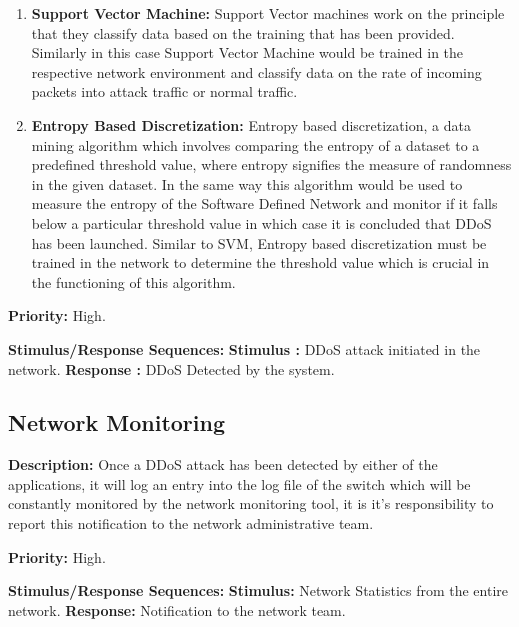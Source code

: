 \documentclass[12pt,a4paper,final]{report}
\begin{document}
\begin{enumerate}
\item 
\textbf{Support Vector Machine: } 
\newline
Support Vector machines work on the principle that they classify data based on the training that has been provided. Similarly in this case Support Vector Machine would be trained in the respective network environment and classify data on the rate of incoming packets into attack traffic or normal traffic.

\item
\textbf{Entropy Based Discretization: } 
\newline
Entropy based discretization, a data mining algorithm which involves comparing the entropy of a dataset to a predefined threshold value, where entropy signifies the measure of randomness in the given dataset. In the same way this algorithm would be used to measure the entropy of the Software Defined Network and monitor if it falls below a particular threshold value in which case it is concluded that DDoS has been launched. Similar to SVM, Entropy based discretization must be trained in the network to determine the threshold value which is crucial in the functioning of this algorithm.
\end{enumerate}

\noindent
\textbf{Priority: } High.
\newline

\noindent
\textbf{Stimulus/Response Sequences: }
\newline
\textbf{Stimulus :} DDoS attack initiated in the network.       \newline
\textbf{Response :} DDoS Detected by the system.   
\newline

\subsection{Network Monitoring}
\textbf{Description: } 
\newline
Once a DDoS attack has been detected by either of the applications, it will log an entry into the log file of the switch which will be constantly monitored by the network monitoring tool, it is it's responsibility to report this notification to the network administrative team.
\newline

\noindent
\textbf{Priority: } High.
\newline

\noindent
\textbf{Stimulus/Response Sequences: }\newline
\textbf{Stimulus: } Network Statistics from the entire network. 
\newline
\textbf{Response: } Notification to the network team.           \newline
\end{document}

